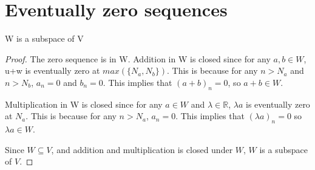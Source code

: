 \section{Eventually zero sequences}
W is a subspace of V
\begin{proof}
    The zero sequence is in W.
    Addition in W is closed since for any $a,b \in W$,
    u+w is eventually zero at $max(\{N_a, N_b\})$.
    This is because for any $n > N_a$ and $n > N_b$,
    $a_n = 0$ and $b_n = 0$.
    This implies that $(a+b)_n = 0$,
    so $a+b \in W$. \gap

    Multiplication in W is closed since 
    for any $a \in W$ and $\lambda \in \mathbb{R}$,
    $\lambda a$ is eventually zero at $N_a$.
    This is because for any $n > N_a$,
    $a_n = 0$.
    This implies that $(\lambda a)_n = 0$
    so $\lambda a \in W$. \gap

    Since $W \subseteq V$, and 
    addition and multiplication is closed under $W$,
    $W$ is a subspace of $V$.
\end{proof}
